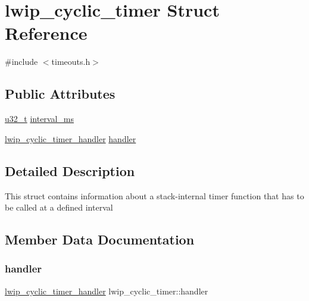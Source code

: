 \hypertarget{structlwip__cyclic__timer}{}\section{lwip\+\_\+cyclic\+\_\+timer Struct Reference}
\label{structlwip__cyclic__timer}


{\ttfamily \#include $<$timeouts.\+h$>$}

\subsection*{Public Attributes}
\begin{DoxyCompactItemize}
\item 
\hyperlink{group__compiler__abstraction_ga4c14294869aceba3ef9d4c0c302d0f33}{u32\+\_\+t} \hyperlink{structlwip__cyclic__timer_addbc7ac275287e62a81cdd16b3dd56f9}{interval\+\_\+ms}
\item 
\hyperlink{openmote-cc2538_2lwip_2src_2include_2lwip_2timeouts_8h_a985c5d366b62bd179195e093ffcb7ecd}{lwip\+\_\+cyclic\+\_\+timer\+\_\+handler} \hyperlink{structlwip__cyclic__timer_a4fada87ea068f44bbb92c63b4d65ac1d}{handler}
\end{DoxyCompactItemize}


\subsection{Detailed Description}
This struct contains information about a stack-\/internal timer function that has to be called at a defined interval 

\subsection{Member Data Documentation}
\mbox{\label{structlwip__cyclic__timer_a4fada87ea068f44bbb92c63b4d65ac1d}} 
\subsubsection{\texorpdfstring{handler}{handler}}
{\footnotesize\ttfamily \hyperlink{openmote-cc2538_2lwip_2src_2include_2lwip_2timeouts_8h_a985c5d366b62bd179195e093ffcb7ecd}{lwip\+\_\+cyclic\+\_\+timer\+\_\+handler} lwip\+\_\+cyclic\+\_\+timer\+::handler}

